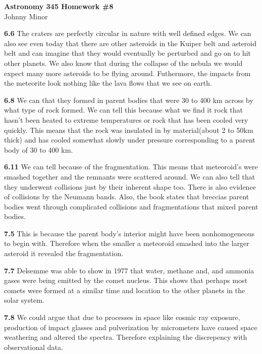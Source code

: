 \documentclass[12pt, leqno]{article}
\begin{document}
{\centering 

\textbf{Astronomy 345 Homework \#8} \\
Johnny Minor 

\medskip 
}

\noindent \textbf{6.6} 
The craters are perfectly circular in nature with well defined edges. We can also see even today that there are other asteroids in the Kuiper belt and asteroid belt and can imagine that they would eventually be perturbed and go on to hit other planets. We also know that during the collapse of the nebula we would expect many more asteroids to be flying around. Futhermore, the impacts from the meteorite look nothing like the lava flows that we see on earth. 

\bigskip

\noindent \textbf{6.8} 
We can that they formed in parent bodies that were 30 to 400 km across by what type of rock formed. We can tell this because what we find it rock that hasn't been heated to extreme temperatures or rock that has been cooled very quickly. This means that the rock was insulated in by material(about 2 to 50km thick) and has cooled somewhat slowly under pressure corresponding to a parent body of 30 to 400 km. 

\bigskip

\noindent \textbf{6.11}
We can tell because of the fragmentation. This means that meteoroid's were smashed together and the remnants were scattered around. We can also tell that they underwent collisions just by their inherent shape too. There is also evidence of collisions by the Neumann bands. Also, the book states that breccias parent bodies went through complicated collisions and fragmentations that mixed parent bodies. 

\bigskip

\noindent \textbf{7.5}
This is because the parent body's interior might have been nonhomogeneous to begin with. Therefore when the smaller a meteoroid smashed into the larger asteroid it revealed the fragmentation. 

\bigskip 

\noindent \textbf{7.7}
Delsemme was able to show in 1977 that water, methane and, and ammonia gases were being emitted by the comet nucleus. This shows that perhaps most comets were formed at a similar time and location to the other planets in the solar system. 

\bigskip

\noindent \textbf{7.8}
We could argue that due to processes in space like cosmic ray exposure, production of impact glasses and pulverization by micrometers have caused space weathering and altered the spectra. Therefore explaining the discrepency with observational data. 
\end{document}
